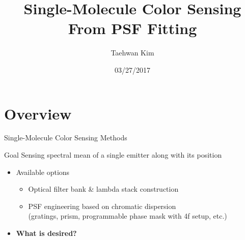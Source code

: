 \documentclass[t]{beamer}
\title[]{
    \LARGE{
        Single-Molecule Color Sensing \\ From PSF Fitting
    }
}
\author[Taehwan Kim]{
    Taehwan Kim
}
\institute[]{University of California, Berkeley}
\date{03/27/2017}
\begin{document}
%

\begin{frame}[c]
  \titlepage
\end{frame}


\section{Overview}

\begin{frame}{Single-Molecule Color Sensing Methods}
    \begin{block}{Goal}
        \centering
        Sensing spectral mean of a single emitter along with its position
    \end{block}
    \begin{itemize}
        \item Available options
        \begin{itemize}
            \item Optical filter bank \& lambda stack construction
            \item PSF engineering based on chromatic dispersion \\(gratings, prism, programmable phase mask with 4f setup, etc.)
        \end{itemize}
    \item \textbf{What is desired?}
    \end{itemize}
\end{frame}
\end{document}
